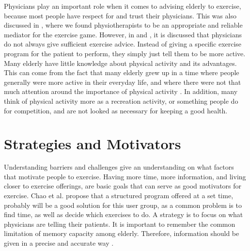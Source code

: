 Physicians play an important role when it comes to advising elderly to exercise, because most people have respect for and trust their physicians. This was also discussed in \cite{project}, where we found physiotherapists to be an appropriate and reliable mediator for the exercise game. However, in \cite{schutzer} and \cite{chao}, it is discussed that physicians do not always give sufficient exercise advice. Instead of giving a specific exercise program for the patient to perform, they simply just tell them to be more active. Many elderly have little knowledge about physical activity and its advantages. This can come from the fact that many elderly grew up in a time where people generally were more active in their everyday life, and where there were not that much attention around the importance of physical activity \cite{schutzer}. In addition, many think of physical activity more as a recreation activity, or something people do for competition, and are not looked as necessary for keeping a good health.  

\section{Strategies and Motivators}
\label{sec:motivators}
Understanding barriers and challenges give an understanding on what factors that motivate people to exercise. Having more time, more information, and living closer to exercise offerings, are basic goals that can serve as good motivators for exercise. Chao et al. \cite{chao} propose that a structured program offered at a set time, probably will be a good solution for this user group, as a common problem is to find time, as well as decide which exercises to do. A strategy is to focus on what physicians are telling their patients. It is important to remember the common limitation of memory capacity among elderly. Therefore, information should be given in a precise and accurate way \cite{chao}.  

